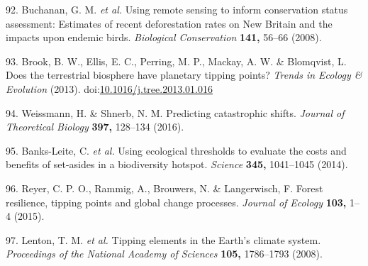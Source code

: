 \documentclass[]{article}
\begin{document}
\hypertarget{ref-Buchanan2008}{}
92. Buchanan, G. M. \emph{et al.} Using remote sensing to inform
conservation status assessment: Estimates of recent deforestation rates
on New Britain and the impacts upon endemic birds. \emph{Biological
Conservation} \textbf{141,} 56--66 (2008).

\hypertarget{ref-Brook2013}{}
93. Brook, B. W., Ellis, E. C., Perring, M. P., Mackay, A. W. \&
Blomqvist, L. Does the terrestrial biosphere have planetary tipping
points? \emph{Trends in Ecology \& Evolution} (2013).
doi:\href{https://doi.org/10.1016/j.tree.2013.01.016}{10.1016/j.tree.2013.01.016}

\hypertarget{ref-Weissmann2016}{}
94. Weissmann, H. \& Shnerb, N. M. Predicting catastrophic shifts.
\emph{Journal of Theoretical Biology} \textbf{397,} 128--134 (2016).

\hypertarget{ref-Banks-Leite2014}{}
95. Banks-Leite, C. \emph{et al.} Using ecological thresholds to
evaluate the costs and benefits of set-asides in a biodiversity hotspot.
\emph{Science} \textbf{345,} 1041--1045 (2014).

\hypertarget{ref-Reyer2015}{}
96. Reyer, C. P. O., Rammig, A., Brouwers, N. \& Langerwisch, F. Forest
resilience, tipping points and global change processes. \emph{Journal of
Ecology} \textbf{103,} 1--4 (2015).

\hypertarget{ref-Lenton2008}{}
97. Lenton, T. M. \emph{et al.} Tipping elements in the Earth's climate
system. \emph{Proceedings of the National Academy of Sciences}
\textbf{105,} 1786--1793 (2008).
\end{document}
